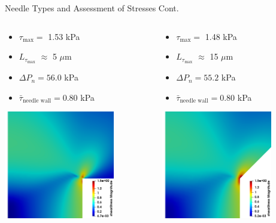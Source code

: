 \begin{frame}{Needle Types and Assessment of Stresses Cont.}

\begin{columns}
\begin{column}{.30\textwidth}
\begin{itemize}
    \item $\tau_{\text{max}} = $ 1.53 kPa
    \item $L_{\tau_{\text{max}}}$  $\approx$ 5 $\mu$m
    \item $\Delta P_n = 56.0$ kPa
    \item $\bar{\tau}_{\text{needle wall}} = 0.80$ kPa 
\end{itemize}
\vspace{1mm}
\centering
\includegraphics[trim = 0mm 0mm 0mm 50mm, clip, width=1.9in]{./images/needle_90_stress@25C.png}
\end{column}

\begin{column}{.30\textwidth}
\begin{itemize}
    \item $\tau_{\text{max}} = $ 1.48 kPa
    \item $L_{\tau_{\text{max}}}$  $\approx$ 15 $\mu$m
    \item $\Delta P_n = 55.2$ kPa
    \item $\bar{\tau}_{\text{needle wall}} = 0.80$ kPa 
\end{itemize}
\vspace{1mm}
\centering
\includegraphics[trim = 0mm 0mm 0mm 50mm, clip, width=1.9in]{./images/needle_45_stress@25C.png}
\end{column}


\end{columns}
\end{frame}
